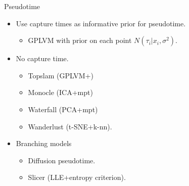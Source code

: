 \documentclass[ignorenonframetext]{beamer}
\begin{document}
\begin{frame}{Pseudotime}
\begin{itemize}
\item Use capture times as informative prior for pseudotime.
	\begin{itemize}
    	\item GPLVM with prior on each point $N(\tau_i | x_i, \sigma^2)$.
	\end{itemize}
\item No capture time.
	\begin{itemize}
    	\item Topslam (GPLVM+)
    	\item Monocle (ICA+mpt)
    	\item Waterfall (PCA+mpt)
    	\item Wanderlust (t-SNE+k-nn).
	\end{itemize}
\item Branching models
	\begin{itemize}
    	\item Diffusion pseudotime.
    	\item Slicer (LLE+entropy criterion).
	\end{itemize}
\end{itemize}
\end{frame}    
    
    
\end{document}
